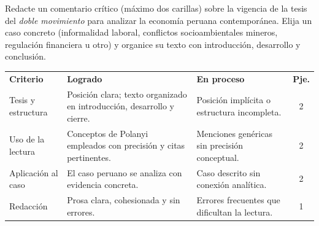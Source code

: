 \documentclass{evaluacion}
\begin{document}
\begin{pregunta}
Redacte un comentario crítico (máximo dos carillas) sobre la vigencia de
la tesis del \emph{doble movimiento} para analizar la economía peruana
contemporánea. Elija un caso concreto (informalidad laboral, conflictos
socioambientales mineros, regulación financiera u otro) y organice su
texto con introducción, desarrollo y conclusión.

\begin{criterios}
\small
\renewcommand{\arraystretch}{1.35}
\begin{tabularx}{\linewidth}{@{}p{2.9cm} X X c@{}}
  \textbf{Criterio} & \textbf{Logrado} & \textbf{En proceso} & \textbf{Pje.}\\
  \arrayrulecolor{grislinea}\hline\addlinespace[3pt]
  Tesis y estructura &
    Posición clara; texto organizado en intro\-ducción, desarrollo y cierre. &
    Posición implícita o estructura incompleta. & 2\\
  Uso de la lectura &
    Conceptos de Polanyi empleados con precisión y citas pertinentes. &
    Menciones genéricas sin precisión conceptual. & 2\\
  Aplicación al caso &
    El caso peruano se analiza con evidencia concreta. &
    Caso descrito sin conexión analítica. & 2\\
  Redacción &
    Prosa clara, cohesionada y sin errores. &
    Errores frecuentes que dificultan la lectura. & 1\\
\end{tabularx}
\end{criterios}
\end{pregunta}

\findelexamen
\end{document}
